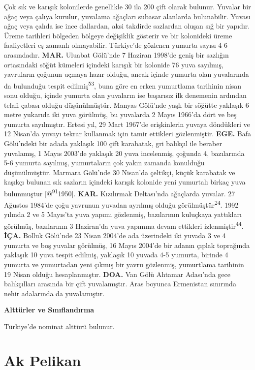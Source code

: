 \documentclass[
  letterpaper,
  DIV=11,
  numbers=noendperiod]{scrreprt}
\begin{document}
Çok sık ve karışık kolonilerde genellikle 30 ila 200 çift olarak
bulunur. Yuvalar bir ağaç veya çalıya kurulur, yuvalama ağaçları subasar
alanlarda bulunabilir. Yuvası ağaç veya çalıda ise ince dallardan, aksi
takdirde sazlardan oluşan sığ bir yapıdır. Üreme tarihleri bölgeden
bölgeye değişiklik gösterir ve bir kolonideki üreme faaliyetleri eş
zamanlı olmayabilir. Türkiye'de gözlenen yumurta sayısı 4-6 arasındadır.
\textbf{MAR.} Uluabat Gölü'nde 7 Haziran 1998'de geniş bir sazlığın
ortasındaki söğüt kümeleri içindeki karışık bir kolonide 76 yuva
sayılmış, yavruların çoğunun uçmaya hazır olduğu, ancak içinde yumurta
olan yuvalarında da bulunduğu tespit edilmiş\textsuperscript{53}, buna
göre en erken yumurtlama tarihinin nisan sonu olduğu, içinde yumurta
olan yuvaların ise başarısız ilk denemenin ardından telafi çabası olduğu
düşünülmüştür. Manyas Gölü'nde yaşlı bir söğütte yaklaşık 6 metre
yukarıda iki yuva görülmüş, bu yuvalarda 2 Mayıs 1966'da dört ve beş
yumurta sayılmıştır. Ertesi yıl, 29 Mart 1967'de erişkinlerin yuvaya
döndükleri ve 12 Nisan'da yuvayı tekrar kullanmak için tamir ettikleri
gözlenmiştir. \textbf{EGE.} Bafa Gölü'ndeki bir adada yaklaşık 100 çift
karabatak, gri balıkçıl ile beraber yuvalamış, 1 Mayıs 2003'de yaklaşık
20 yuva incelenmiş, çoğunda 4, bazılarında 5-6 yumurta sayılmış,
yumurtaların çok yakın zamanda konulduğu düşünülmüştür. Marmara Gölü'nde
30 Nisan'da çeltikçi, küçük karabatak ve kaşıkçı bulunan sık sazların
içindeki karışık kolonide yeni yumurtalı birkaç yuva bulunmuştur
{[}@\textsuperscript{91}1950{]}. \textbf{KAR.} Kızılırmak Deltası'nda
ağaçlarda yuvalar. 27 Ağustos 1984'de çoğu yavrunun yuvadan ayrılmış
olduğu görülmüştür\textsuperscript{24}. 1992 yılında 2 ve 5 Mayıs'ta
yuva yapımı gözlenmiş, bazılarının kuluçkaya yattıkları görülmüş,
bazılarının 3 Haziran'da yuva yapımına devam ettikleri
izlenmiştir\textsuperscript{44}. \textbf{İÇA.} Bolluk Gölü'nde 23 Nisan
2004'de ada üzerindeki iki yuvada 3 ve 4 yumurta ve boş yuvalar
görülmüş, 16 Mayıs 2004'de bir adanın çıplak toprağında yaklaşık 10 yuva
tespit edilmiş, yaklaşık 10 yuvada 4-5 yumurta, birinde 4 yumurta ve
yumurtadan yeni çıkmış bir yavru gözlenmiş, yumurtlama tarihinin 19
Nisan olduğu hesaplanmıştır. \textbf{DOA.} Van Gölü Ahtamar Adası'nda
gece balıkçılları arasında bir çift yuvalamıştır. Aras boyunca
Ermenistan sınırında nehir adalarında da yuvalamıştır.

\textbf{Alttürler ve Sınıflandırma}

Türkiye'de nominat alttürü bulunur.

\section{Ak Pelikan}\label{ak-pelikan}
\end{document}
